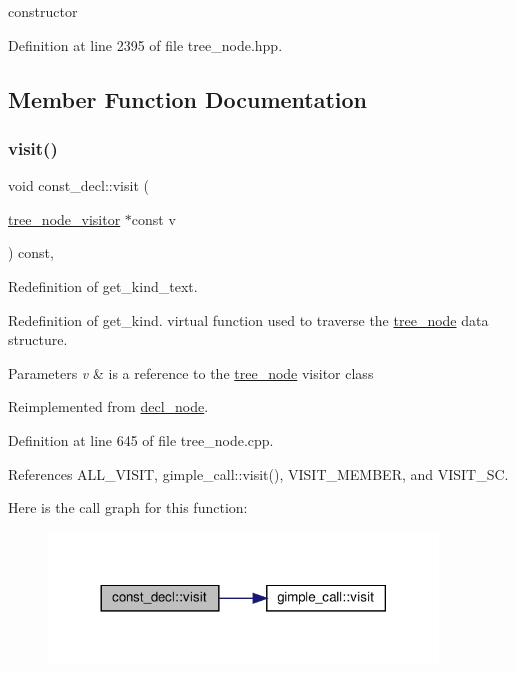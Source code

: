 constructor 



Definition at line 2395 of file tree\+\_\+node.\+hpp.



\subsection{Member Function Documentation}
\mbox{\label{structconst__decl_a50bf1b7d73f36fdb7c5036eba097f97e}} 
\subsubsection{\texorpdfstring{visit()}{visit()}}
{\footnotesize\ttfamily void const\+\_\+decl\+::visit (\begin{DoxyParamCaption}\item[{\hyperlink{classtree__node__visitor}{tree\+\_\+node\+\_\+visitor} $\ast$const}]{v }\end{DoxyParamCaption}) const\hspace{0.3cm}{\ttfamily [override]}, {\ttfamily [virtual]}}



Redefinition of get\+\_\+kind\+\_\+text. 

Redefinition of get\+\_\+kind. virtual function used to traverse the \hyperlink{classtree__node}{tree\+\_\+node} data structure. 
\begin{DoxyParams}{Parameters}
{\em v} & is a reference to the \hyperlink{classtree__node}{tree\+\_\+node} visitor class \\
\hline
\end{DoxyParams}


Reimplemented from \hyperlink{structdecl__node_a9e63331f0c35d9af9d1997afafe9152a}{decl\+\_\+node}.



Definition at line 645 of file tree\+\_\+node.\+cpp.



References A\+L\+L\+\_\+\+V\+I\+S\+IT, gimple\+\_\+call\+::visit(), V\+I\+S\+I\+T\+\_\+\+M\+E\+M\+B\+ER, and V\+I\+S\+I\+T\+\_\+\+SC.

Here is the call graph for this function\+:
\nopagebreak
\begin{figure}[H]
\begin{center}
\leavevmode
\includegraphics[width=293pt]{da/d2d/structconst__decl_a50bf1b7d73f36fdb7c5036eba097f97e_cgraph}
\end{center}
\end{figure}


